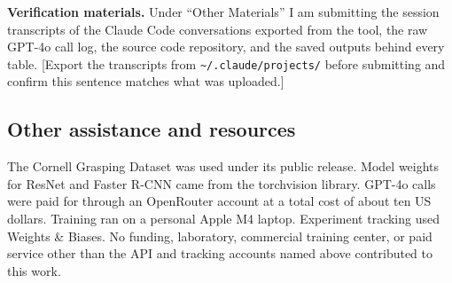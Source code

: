 \documentclass[12pt,letterpaper]{article}
\begin{document}
\textbf{Verification materials.} Under ``Other Materials'' I am
submitting the session transcripts of the Claude Code conversations
exported from the tool, the raw GPT-4o call log, the source code
repository, and the saved outputs behind every table. [Export the
transcripts from \texttt{\textasciitilde/.claude/projects/} before
submitting and confirm this sentence matches what was uploaded.]

\subsection*{Other assistance and resources}

The Cornell Grasping Dataset was used under its public release. Model
weights for ResNet and Faster R-CNN came from the torchvision library.
GPT-4o calls were paid for through an OpenRouter account at a total cost
of about ten US dollars. Training ran on a personal Apple M4 laptop.
Experiment tracking used Weights \& Biases. No funding, laboratory,
commercial training center, or paid service other than the API and
tracking accounts named above contributed to this work.
\end{document}
